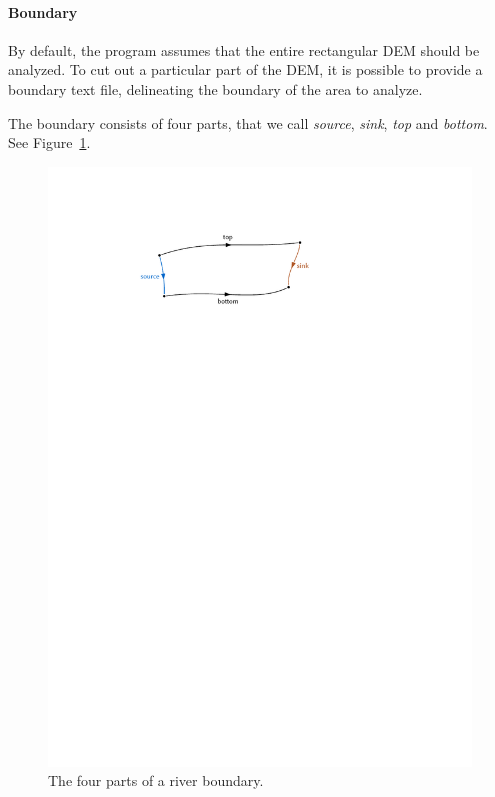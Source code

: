 \documentclass{article}
\begin{document}
\paragraph{Boundary}
By default, the program assumes that the entire rectangular DEM should be analyzed. To cut out a particular part of the DEM, it is possible to provide a boundary text file, delineating the boundary of the area to analyze.

The boundary consists of four parts, that we call \emph{source}, \emph{sink}, \emph{top} and \emph{bottom}. See Figure~\ref{fig:river-boundary}.

\begin{figure}
    \centering
    \includegraphics{figures/river-boundary}
    \caption{The four parts of a river boundary.}
    \label{fig:river-boundary}
\end{figure}
\end{document}
